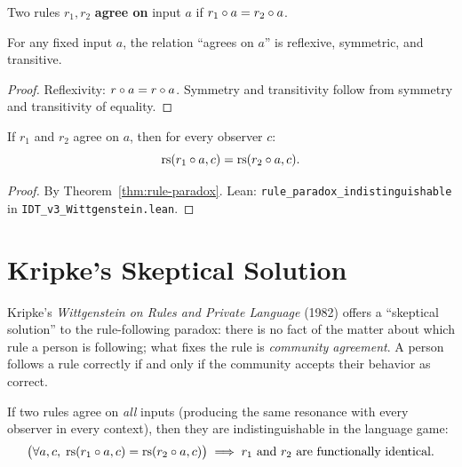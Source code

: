 \begin{definition}
\label{def:ext-agreement}
Two rules $r_1, r_2$ \textbf{agree on} input $a$ if
$r_1 \circ a = r_2 \circ a$.
\end{definition}

\begin{theorem}
\label{thm:agreement-equiv}
For any fixed input $a$, the relation ``agrees on $a$'' is reflexive,
symmetric, and transitive.
\end{theorem}

\begin{proof}
Reflexivity: $r \circ a = r \circ a$. Symmetry and transitivity
follow from symmetry and transitivity of equality.
\end{proof}

\begin{theorem}
\label{thm:obs-indist}
If $r_1$ and $r_2$ agree on $a$, then for every observer $c$:
\[
\mathrm{rs}(r_1 \circ a, c) = \mathrm{rs}(r_2 \circ a, c).
\]
\end{theorem}

\begin{proof}
By Theorem~\ref{thm:rule-paradox}.
Lean: \texttt{rule\_paradox\_indistinguishable} in \texttt{IDT\_v3\_Wittgenstein.lean}.
\end{proof}

\section{Kripke's Skeptical Solution}

Kripke's \textit{Wittgenstein on Rules and Private Language} (1982) offers
a ``skeptical solution'' to the rule-following paradox: there is no fact of the
matter about which rule a person is following; what fixes the rule is
\emph{community agreement}. A person follows a rule correctly if and only if
the community accepts their behavior as correct.

\begin{theorem}
\label{thm:community-decides}
If two rules agree on \emph{all} inputs (producing the same resonance
with every observer in every context), then they are indistinguishable
in the language game:
\[
\bigl(\forall a, c,\; \mathrm{rs}(r_1 \circ a, c) = \mathrm{rs}(r_2 \circ a, c)\bigr)
\implies \text{$r_1$ and $r_2$ are functionally identical}.
\]
\end{theorem}

